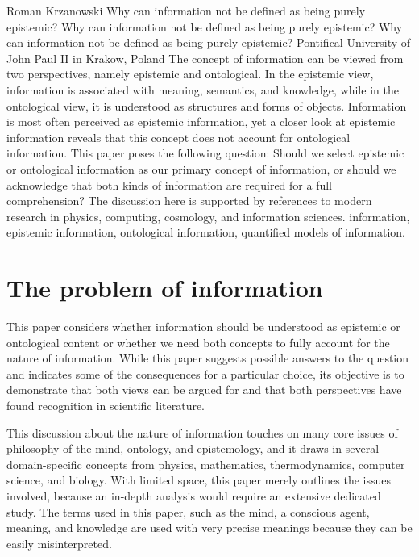 \begin{artengenv}{Roman Krzanowski}
	{Why can information not be defined as being purely epistemic?}
	{Why can information not be defined as being purely epistemic?}
	{Why can information not be defined as being purely epistemic?}
	{Pontifical University of John Paul II in Krakow, Poland}
	{The concept of information can be viewed from two perspectives, namely epistemic and ontological. In the epistemic view, information is associated with meaning, semantics, and knowledge, while in the ontological view, it is understood as structures and forms of objects. Information is most often perceived as epistemic information, yet a closer look at epistemic information reveals that this concept does not account for ontological information. This paper poses the following question: Should we select epistemic or ontological information as our primary concept of information, or should we acknowledge that both kinds of information are required for a full comprehension? The discussion here is supported by references to modern research in physics, computing, cosmology, and information sciences.}
	{information, epistemic information, ontological information, quantified models of information.}




\section{The problem of information}
\enlargethispage{\baselineskip}
\lettrine[loversize=0.13,lines=2,lraise=-0.05,nindent=0em,findent=0.2pt]%
{T}{}his paper considers whether information should be understood as epistemic or ontological content or whether we need both concepts to fully account for the nature of information. While this paper suggests possible answers to the question and indicates some of the consequences for a particular choice, its objective is to demonstrate that both views can be argued for and that both perspectives have found recognition in scientific literature.

This discussion about the nature of information touches on many core issues of philosophy of the mind, ontology, and epistemology, and it draws in several domain-specific concepts from physics, mathematics, thermodynamics, computer science, and biology. With limited space, this paper merely outlines the issues involved, because an in-depth analysis would require an extensive dedicated study. The terms used in this paper, such as the mind, a conscious agent, meaning, and knowledge are used with very precise meanings because they can be easily misinterpreted.


\end{artengenv}
